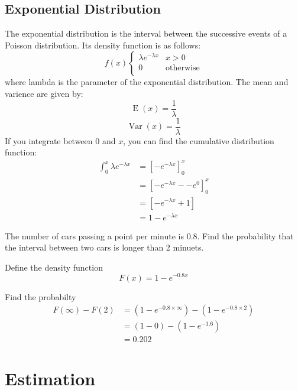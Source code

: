     \subsection{Exponential Distribution}
        The exponential distribution is the interval between the successive events of a Poisson distribution. Its density function is as follows:
        $$
        f(x)
        \begin{cases}
        \lambda e^{-\lambda x} & x > 0\\
        0 & \text{otherwise}\\
        \end{cases}
        $$
        where lambda is the parameter of the exponential distribution. The mean and varience are given by:
        $$\operatorname{E}(x) = \frac{1}{\lambda}$$
        $$\operatorname{Var}(x) = \frac{1}{\lambda}$$
        If you integrate between $0$ and $x$, you can find the cumulative distribution function:
        \begin{align*}
        \int^{x}_{0}{\lambda e^{-\lambda x}}
        &= [-e^{-\lambda x}]^x_0\\
        &= [-e^{-\lambda x} -- e^{0}]^x_0\\
        &= [-e^{-\lambda x} + 1]\\
        &= 1 - e^{-\lambda x}
        \end{align*}

        \begin{example}
        {
        The number of cars passing a point per minute is 0.8. Find the probability that the interval between two cars is longer than 2 minuets.
        }

        \begin{step}{Define the density function}
        $$
        F(x) = 1 - e^{-0.8x}
        $$
        \end{step}

        \begin{step}{Find the probabilty}
        \begin{align*}
        F(\infty) - F(2) 
        &= (1 - e^{-0.8 \times \infty}) - (1 - e^{-0.8 \times 2})\\
        &= (1 - 0) - (1 - e^{-1.6})\\
        &= 0.202
        \end{align*}
        \end{step}

        \end{example}

\section{Estimation}


